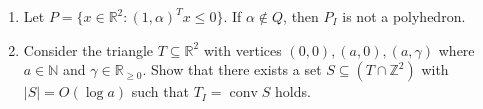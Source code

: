 \documentclass[11pt,a4paper]{article}
\DeclareMathOperator{\conv}{conv}
\begin{document}
\begin{enumerate}
\item Let $P = \{ x ∈ ℝ^2 : (1,α)^T x ≤ 0\}$. If $α ∉ Q$, then $P_I$ is not a polyhedron.





\item Consider the triangle $T ⊆ ℝ^2$ with vertices $(0,0), (a,0), (a, γ)$  where $a ∈ ℕ$ and $γ ∈ ℝ_{≥0}$. Show that there exists a set $S⊆ (T ∩ℤ^2)$ with $|S| = O(\log a)$ such that $T_I = \conv{S}$ holds.  
  
\end{enumerate}



%
%


 
\end{document}
